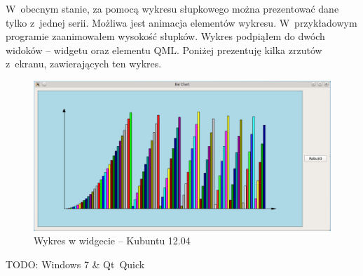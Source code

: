 W~obecnym stanie, za pomocą wykresu słupkowego można prezentować dane tylko z~jednej serii. Możliwa jest animacja elementów wykresu. W~przykładowym programie zaanimowałem wysokość słupków. Wykres podpiąłem do dwóch widoków -- widgetu oraz elementu QML. Poniżej prezentuję kilka zrzutów z~ekranu, zawierających ten wykres. 

\begin{figure}[H]
\centering
\includegraphics[scale=0.5]{img/BarChart_kubuntu.png}
\caption{Wykres w widgecie -- Kubuntu 12.04}\label{rys:bar:kubuntu}
\end{figure}

TODO: Windows 7 \& Qt~Quick




